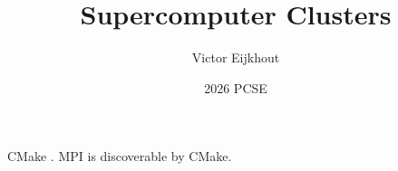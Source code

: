 \documentclass[10pt]{beamer}
\begin{document}
\author[Eijkhout]{Victor Eijkhout}
\date[2026]{2026 PCSE}
\title[clusters]{Supercomputer Clusters}
\maketitle



\begin{numberedframe}{CMake}
  \label{sl:mpi-cmake}.
  MPI is discoverable by CMake.
\end{numberedframe}
\end{document}
